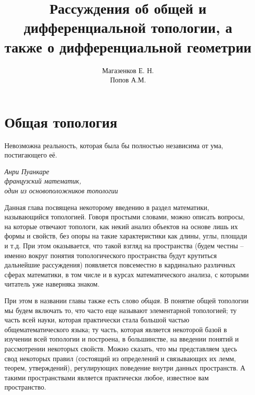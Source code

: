 \documentclass[a4paper, 12pt]{book}
\title{Рассуждения об общей и дифференциальной топологии, а также о дифференциальной геометрии}
\author{Магазенков Е. Н.\\Попов А.М.}
\begin{document}
	
	\renewcommand{\contentsname}{\hfillОГЛАВЛЕНИЕ\hfill} 
	\frontmatter
	\titlepage
	
	\doublespacing
	\tableofcontents
	\let\cleardoublepage\clearpage
	\singlespacing
	
	\mainmatter
	
	\pagestyle{style}
	
	
	\chapter{Общая топология}
	\epigraph{Невозможна реальность, которая была бы полностью независима от ума, постигающего её.	\leavevmode
	}{\itshape Анри Пуанкаре\\ французский математик,\\ один из основоположников топологии}
	
    Данная глава посвящена некоторому введению в раздел математики, называющийся топологией. Говоря простыми словами, можно описать вопросы, на которые отвечают топологи, как некий анализ объектов на основе лишь их формы и свойств, без опоры на такие характеристики как длины, углы, площади и т.д. При этом оказывается, что такой взгляд на пространства (будем честны -- именно вокруг понятия топологического пространства будут крутиться дальнейшие рассуждения) появляется повсеместно в кардинально различных сферах математики, в том числе и в курсах математического анализа, с которыми читатель уже наверняка знаком. 

    При этом в названии главы также есть слово \textit{общая}. В понятие общей топологии мы будем включать то, что часто еще называют элементарной топологией; ту часть всей науки, которая практически стала большой частью общематематического языка; ту часть, которая является некоторой базой в изучении всей топологии и построена, в большинстве, на введении понятий и рассмотрении некоторых свойств. Можно сказать, что мы представляем здесь свод некоторых правил (состоящий из определений и связывающих их лемм, теорем, утверждений), регулирующих поведение внутри данных пространств. А такими пространствами является практически любое, известное вам пространство.


	
	
	
	
\end{document}
